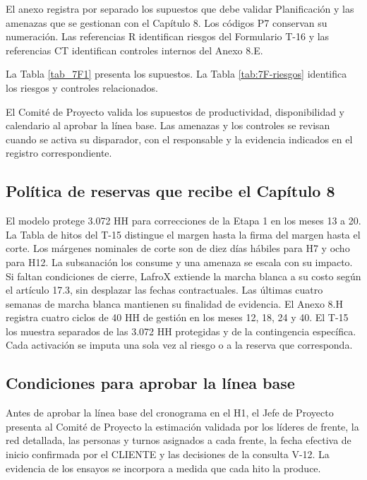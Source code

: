 El anexo registra por separado los supuestos que debe validar Planificación y las amenazas que se gestionan con el Capítulo 8. Los códigos P7 conservan su numeración. Las referencias R identifican riesgos del Formulario T-16 y las referencias CT identifican controles internos del Anexo 8.E.

La Tabla \ref{tab_7F1} presenta los supuestos. La Tabla \ref{tab:7F-riesgos} identifica los riesgos y controles relacionados.


El Comité de Proyecto valida los supuestos de productividad, disponibilidad y calendario al aprobar la línea base. Las amenazas y los controles se revisan cuando se activa su disparador, con el responsable y la evidencia indicados en el registro correspondiente.

\subsection{Política de reservas que recibe el Capítulo 8}

El modelo protege 3.072 HH para correcciones de la Etapa 1 en los meses 13 a 20. La Tabla de hitos del T-15 distingue el margen hasta la firma del margen hasta el corte. Los márgenes nominales de corte son de diez días hábiles para H7 y ocho para H12. La subsanación los consume y una amenaza se escala con su impacto. Si faltan condiciones de cierre, LafroX extiende la marcha blanca a su costo según el artículo 17.3, sin desplazar las fechas contractuales. Las últimas cuatro semanas de marcha blanca mantienen su finalidad de evidencia. El Anexo 8.H registra cuatro ciclos de 40 HH de gestión en los meses 12, 18, 24 y 40. El T-15 los muestra separados de las 3.072 HH protegidas y de la contingencia específica. Cada activación se imputa una sola vez al riesgo o a la reserva que corresponda.

\subsection{Condiciones para aprobar la línea base}

Antes de aprobar la línea base del cronograma en el H1, el Jefe de Proyecto presenta al Comité de Proyecto la estimación validada por los líderes de frente, la red detallada, las personas y turnos asignados a cada frente, la fecha efectiva de inicio confirmada por el CLIENTE y las decisiones de la consulta V-12. La evidencia de los ensayos se incorpora a medida que cada hito la produce.

